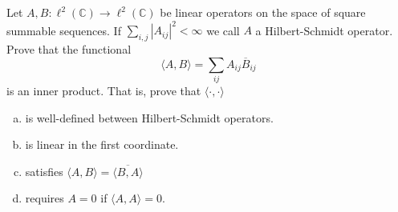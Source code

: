 \documentclass[12pt,letterpaper,cm]{hmcpset}
\begin{document}
\begin{problem}[4]
    Let $A,B : \ell^2(\mathbb{C}) \to \ell^2(\mathbb{C})$ be linear operators on the space of square
    summable sequences. If $\sum_{i,j} |A_{ij}|^2 < \infty$ we call $A$ a Hilbert-Schmidt operator.
    Prove that the functional
    \[
        \langle A,B\rangle = \sum_{ij}A_{ij}\overline B_{ij}
    \]
    is an inner product. That is, prove that $\langle \cdot,\cdot\rangle$
\begin{enumerate}[(a)]
    \item is well-defined between Hilbert-Schmidt operators.
    \item is linear in the first coordinate.
    \item satisfies $\langle A,B\rangle = \overline{\langle B,A\rangle}$
    \item requires $A=0$ if $\langle A,A\rangle = 0$.
\end{enumerate}
\end{problem}

\begin{solution}
    \vfill
\end{solution}
\clearpage
\end{document}
